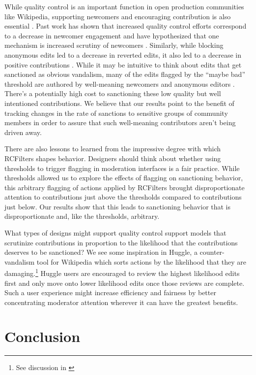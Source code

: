 \documentclass[format=acmsmall, natbib=true,  screen=true]{acmart}
\begin{document}
While quality control is an important function in open production communities like Wikipedia, supporting newcomers and encouraging contribution is also essential \cite{halfaker_rise_2013, morgan_tea_2013}.  
Past work has shown that increased quality control efforts correspond to a decrease in newcomer engagement and have hypothesized that one mechanism is increased scrutiny of newcomers \cite{halfaker_rise_2013, teblunthuis_revisiting_2018}.  Similarly, while blocking anonymous edits led to a decrease in reverted edits, it also led to a decrease in positive contributions \cite{hill_hidden_2020}.  While it may be intuitive to think about edits that get sanctioned as obvious vandalism, many of the edits flagged by the ``maybe bad'' threshold are authored by well-meaning newcomers and anonymous editors \cite{halfaker_rise_2013}.  There's a potentially high cost to sanctioning these low quality but well intentioned contributions. We believe that our results point to the benefit of tracking changes in the rate of sanctions to sensitive groups of community members in order to assure that such well-meaning contributors aren't being driven away.

There are also lessons to learned from the impressive degree with which RCFilters shapes behavior. Designers should think about whether using thresholds to trigger flagging in moderation interfaces is a fair practice.  While thresholds allowed us to explore the effects of flagging on sanctioning behavior, this arbitrary flagging of actions applied by RCFilters brought disproportionate attention to contributions just above the thresholds compared to contributions just below.  Our results show that this leads to sanctioning behavior that is disproportionate and, like the thresholds, arbitrary.

What types of designs might support quality control support models that scrutinize contributions in proportion to the likelihood that the contributions deserves to be sanctioned? We see some inspiration in Huggle, a counter-vandalism tool for Wikipedia which sorts actions by the likelihood that they are damaging.\footnote{See discussion in \cite{halfaker_snuggle:_2014}} Huggle users are encouraged to review the highest likelihood edits first and only move onto lower likelihood edits once those reviews are complete.  Such a user experience might increase efficiency and fairness by better concentrating moderator attention wherever it can have the greatest benefits.


\section{Conclusion}
\end{document}
